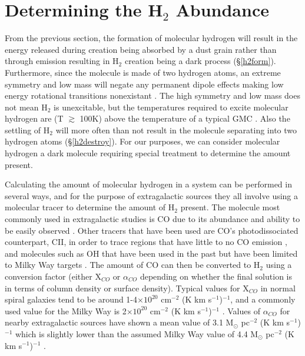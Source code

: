 \section{Determining the H$_2$ Abundance}

From the previous section, the formation of molecular hydrogen will result in the energy released during creation being absorbed by a dust grain rather than through emission resulting in H$_2$ creation being a dark process (\S\ref{h2form}).  Furthermore, since the molecule is made of two hydrogen atoms, an extreme symmetry and low mass will negate any permanent dipole effects making low energy rotational transitions nonexistant \citep{bolatto2013,kennicutt2012}.  The high symmetry and low mass does not mean H$_2$ is unexcitable, but the temperatures required to excite molecular hydrogen are (T $\gtrsim$ 100K) above the temperature of a typical GMC \citep{bolatto2013}.  Also the settling of H$_2$ will more often than not result in the molecule separating into two hydrogen atoms (\S\ref{h2destroy}).  For our purposes, we can consider molecular hydrogen a dark molecule requiring special treatment to determine the amount present.

Calculating the amount of molecular hydrogen in a system can be performed in several ways, and for the purpose of extragalactic sources they all involve using a molecular tracer to determine the amount of H$_2$ present.  The molecule most commonly used in extragalactic studies is CO due to its abundance and ability to be easily observed \citep{bolatto2013}.  Other tracers that have been used are CO's photodissociated counterpart, CII, in order to trace regions that have little to no CO emission \citep{madden1997}, and molecules such as OH that have been used in the past but have been limited to Milky Way targets \citep{barrett1964}.  The amount of CO can then be converted to H$_2$ using a conversion factor (either X$_{CO}$ or $\alpha_{CO}$ depending on whether the final solution is in terms of column density or surface density).  Typical values for X$_{CO}$ in normal spiral galaxies tend to be around 1-4$\times 10^{20}$ cm$^{-2}$ (K km s$^{-1}$)$^{-1}$, and a commonly used value for the Milky Way is 2$\times 10^{20}$ cm$^{-2}$ (K km s$^{-1}$)$^{-1}$ \citep{bolatto2013}. Values of $\alpha_{CO}$ for nearby extragalactic sources have shown a mean value of 3.1 M$_\odot$ pc$^{-2}$ (K km s$^{-1}$)$^{-1}$ which is slightly lower than the assumed Milky Way value of 4.4 M$_\odot$ pc$^{-2}$ (K km s$^{-1}$)$^{-1}$ \citep{sandstrom2013}.

